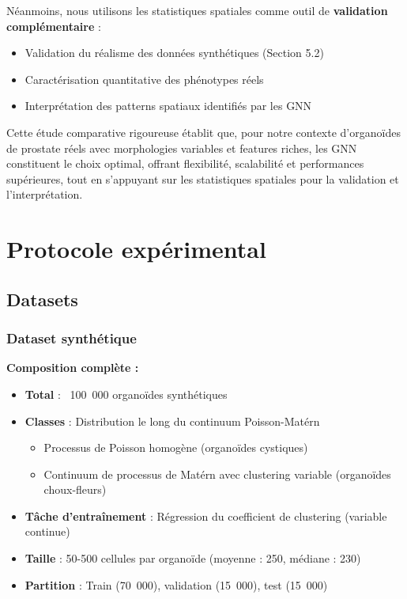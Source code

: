 Néanmoins, nous utilisons les statistiques spatiales comme outil de \textbf{validation complémentaire} :
\begin{itemize}
    \item Validation du réalisme des données synthétiques (Section 5.2)
    \item Caractérisation quantitative des phénotypes réels
    \item Interprétation des patterns spatiaux identifiés par les GNN
\end{itemize}

Cette étude comparative rigoureuse établit que, pour notre contexte d'organoïdes de prostate réels avec morphologies variables et features riches, les GNN constituent le choix optimal, offrant flexibilité, scalabilité et performances supérieures, tout en s'appuyant sur les statistiques spatiales pour la validation et l'interprétation.

\section{Protocole expérimental}

\subsection{Datasets}

\subsubsection{Dataset synthétique}

\textbf{Composition complète :}
\begin{itemize}
    \item \textbf{Total} : ~100~000 organoïdes synthétiques
    \item \textbf{Classes} : Distribution le long du continuum Poisson-Matérn
    \begin{itemize}
        \item Processus de Poisson homogène (organoïdes cystiques)
        \item Continuum de processus de Matérn avec clustering variable (organoïdes choux-fleurs)
    \end{itemize}
    \item \textbf{Tâche d'entraînement} : Régression du coefficient de clustering (variable continue)
    \item \textbf{Taille} : 50-500 cellules par organoïde (moyenne : 250, médiane : 230)
    \item \textbf{Partition} : Train (70~000), validation (15~000), test (15~000)
\end{itemize}

